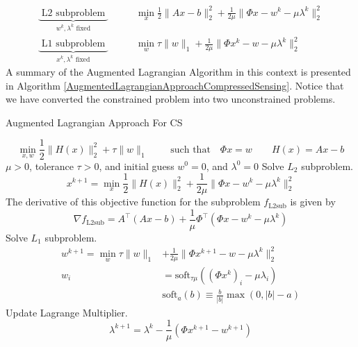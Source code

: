\documentclass[a4paper]{article}
\begin{document}
\[
\begin{split}
\underbrace{\text{ L2 subproblem }}_{w^k , \lambda^k \text{ fixed}}
\qquad
&\min_x 
  \frac{1}{2} \|Ax -b\|_2^2 
+ \frac{1}{2 \mu }\|\Phi x   - w^k - \mu \lambda^k \|_2^2
\\
\underbrace{\text{ L1 subproblem }}_{x^k , \lambda^k \text{ fixed}}
\qquad
& \min_w 
  \tau \|w\|_1
+ \frac{1}{2 \mu }\|\Phi x^k - w   - \mu \lambda^k \|_2^2
\end{split}
\]
A summary of the Augmented Lagrangian Algorithm in this context is presented in 
Algorithm \ref{AugmentedLagrangianApproachCompressedSensing}.
Notice that we have converted the constrained problem
into two unconstrained problems. 

\begin{algorithm}                      %
\caption{Augmented Lagrangian Approach For CS}%
\label{AugmentedLagrangianApproachCompressedSensing}               %
\begin{algorithmic}                    %
        \STATE
\[
  \min_{x,w} \frac{1}{2} \|H(x)\|_2^2 + \tau \| w\|_1
\qquad
\text{ such that}
\quad
\Phi x = w
\qquad
H(x) = Ax-b
\]
    \REQUIRE $\mu > 0$, tolerance $\tau > 0$, and initial guess $w^0=0$, and $\lambda^0=0$
        \STATE Solve $L_2$ subproblem. 
             \[
                x^{k+1} = \min_x \frac{1}{2} \|H(x)\|_2^2  + \frac{1}{2\mu} \|\Phi x -w^k - \mu \lambda^k \|_2^2
             \]
         The derivative of this objective function for the subproblem $f_\text{L2sub}$ is given by
             \[
             \nabla f_\text{L2sub}
             =
             A^\top 
             \left(
             A x - b
             \right)
             + 
             \frac{1}{\mu} \Phi^\top 
             \left(
             \Phi x - w^k - \mu \lambda^k
             \right)
             \]
        \STATE Solve $L_1$ subproblem. 
             \[ \begin{split}
	        w^{k+1} = \min_w \tau \|w\|_1 & + \frac{1}{2\mu} \|\Phi x^{k+1} - w - \mu \lambda^k \|_2^2
                 \\
                 w_i & = \text{soft}_{\tau \mu} \left( (\Phi x^k)_i- \mu\lambda_i \right)
                 \\
                     &  \text{soft}_a(b) \equiv \frac{b}{|b|} \max (0,|b|-a)
             \end{split}\]
        \STATE Update Lagrange Multiplier.
             \[
                \lambda^{k+1} = \lambda^k -  \frac{1}{\mu} (\Phi x^{k+1} -w^{k+1})
             \]
    \ENDWHILE
\end{algorithmic}
\end{algorithm}
\end{document}
